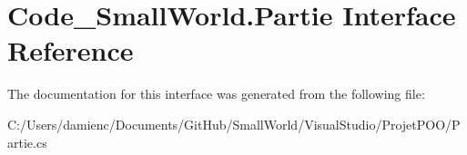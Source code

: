\hypertarget{interface_code___small_world_1_1_partie}{\section{Code\-\_\-\-Small\-World.\-Partie Interface Reference}
\label{interface_code___small_world_1_1_partie}
}


The documentation for this interface was generated from the following file\-:\begin{DoxyCompactItemize}
\item 
C\-:/\-Users/damienc/\-Documents/\-Git\-Hub/\-Small\-World/\-Visual\-Studio/\-Projet\-P\-O\-O/Partie.\-cs\end{DoxyCompactItemize}
